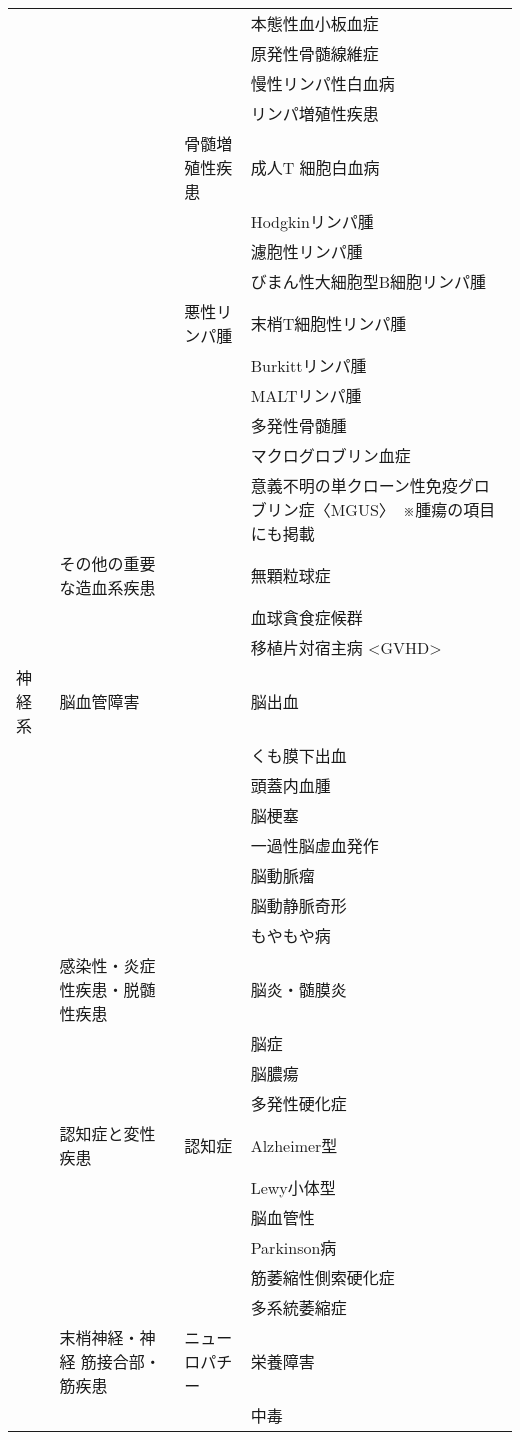 \begin{xltabular}{\linewidth}{XXXX}
 &  &  & 本態性血小板血症 \\
 &  &  & 原発性骨髄線維症 \\
 &  &  & 慢性リンパ性白血病 \\
 &  &  & リンパ増殖性疾患 \\
 &  & 骨髄増殖性疾患 & 成人T 細胞白血病 \\
 &  &  & Hodgkinリンパ腫 \\
 &  &  & 濾胞性リンパ腫 \\
 &  &  & びまん性大細胞型B細胞リンパ腫 \\
 &  & 悪性リンパ腫 & 末梢T細胞性リンパ腫 \\
 &  &  & Burkittリンパ腫 \\
 &  &  & MALTリンパ腫 \\
 &  &  & 多発性骨髄腫 \\
 &  &  & マクログロブリン血症 \\
 &  &  & 意義不明の単クローン性免疫グロブリン症〈MGUS〉　※腫瘍の項目にも掲載 \\
 & その他の重要な造血系疾患 &  & 無顆粒球症 \\
 &  &  & 血球貪食症候群 \\
 &  &  & 移植片対宿主病 <GVHD> \\
神経系 & 脳血管障害 &  & 脳出血 \\
 &  &  & くも膜下出血 \\
 &  &  & 頭蓋内血腫 \\
 &  &  & 脳梗塞 \\
 &  &  & 一過性脳虚血発作 \\
 &  &  & 脳動脈瘤 \\
 &  &  & 脳動静脈奇形 \\
 &  &  & もやもや病 \\
 & 感染性・炎症性疾患・脱髄性疾患 &  & 脳炎・髄膜炎 \\
 &  &  & 脳症 \\
 &  &  & 脳膿瘍 \\
 &  &  & 多発性硬化症 \\
 & 認知症と変性疾患 & 認知症 & Alzheimer型 \\
 &  &  & Lewy小体型 \\
 &  &  & 脳血管性 \\
 &  &  & Parkinson病 \\
 &  &  & 筋萎縮性側索硬化症 \\
 &  &  & 多系統萎縮症 \\
 & 末梢神経・神経 筋接合部・筋疾患 & ニューロパチー & 栄養障害 \\
 &  &  & 中毒 \\

\end{xltabular}

